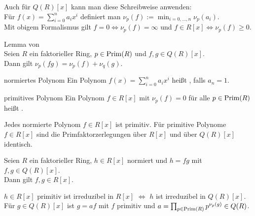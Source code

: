 \begin{Bem}
    Auch für $Q(R)[x]$ kann man diese Schreibweise anwenden:\\
    Für $f(x) = \sum_{i=0}^n a_i x^i$ definiert man
    $\nu_p(f) := \min_{i=0,\dotsc,n} \nu_p(a_i)$.\\
    Mit obigem Formalismus gilt $f = 0 \iff \nu_p(f) = \infty$ und
    $f \in R[x] \iff \nu_p(f) \ge 0$.
\end{Bem}

\linie

\begin{Prop}{Lemma von \upshape\,\!}\\
    Seien $R$ ein faktorieller Ring, $p \in \operatorname{Prim}(R)$ und $f, g \in Q(R)[x]$.\\
    Dann gilt $\nu_p(fg) = \nu_p(f) + \nu_q(g)$.
\end{Prop}

\begin{Def}{normiertes Polynom}
    Ein Polynom $f(x) = \sum_{i=0}^n a_i x^i$ heißt ,
    falls $a_n = 1$.
\end{Def}

\begin{Def}{primitives Polynom}
    Ein Polynom $f \in R[x]$ mit $\nu_p(f) = 0$ für alle $p \in \operatorname{Prim}(R)$
    heißt .
\end{Def}

\begin{Bem}
    Jedes normierte Polynom $f \in R[x]$ ist primitiv.
    Für primitive Polynome $f \in R[x]$ sind die Primfaktorzerlegungen über
    $R[x]$ und über $Q(R)[x]$ identisch.
\end{Bem}

\begin{Kor}
    Seien $R$ ein faktorieller Ring, $h \in R[x]$ normiert
    und $h = fg$ mit $f, g \in Q(R)[x]$.\\
    Dann gilt $f, g \in R[x]$.
\end{Kor}

\begin{Bem}
    $h \in R[x]$ primitiv ist irreduzibel in $R[x]$ $\iff$
    $h$ ist irreduzibel in $Q(R)[x]$.\\
    Für $g \in Q(R)[x]$ ist $g = af$ mit $f$ primitiv und
    $a = \prod_{p \in \operatorname{Prim}(R)} p^{\nu_p(g)} \in Q(R)$.
\end{Bem}

\pagebreak
